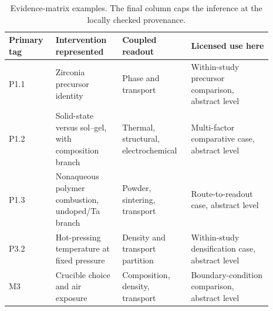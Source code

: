 \begin{table}[t]
\centering
\caption{Evidence-matrix examples. The final column caps the inference at the locally checked provenance.}
\label{tab:evidence-matrix}
\small
\begin{tabular}{P{0.16\linewidth}P{0.23\linewidth}P{0.22\linewidth}P{0.28\linewidth}}
\toprule
Primary tag & Intervention represented & Coupled readout & Licensed use here \\
\midrule
P1.1 & Zirconia precursor identity & Phase and transport & Within-study precursor comparison, abstract level \cite{rahmawati2021a} \\
P1.2 & Solid-state versus sol--gel, with composition branch & Thermal, structural, electrochemical & Multi-factor comparative case, abstract level \cite{kosir2022comparative} \\
P1.3 & Nonaqueous polymer combustion, undoped\slash Ta branch & Powder, sintering, transport & Route-to-readout case, abstract level \cite{weller2019nonaqueous} \\
P3.2 & Hot-pressing temperature at fixed pressure & Density and transport partition & Within-study densification case, abstract level \cite{david2015microstructure} \\
M3 & Crucible choice and air exposure & Composition, density, transport & Boundary-condition comparison, abstract level \cite{xia2016ionic} \\
\bottomrule
\end{tabular}
\end{table}
